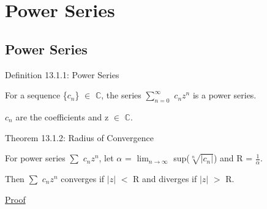 \newpage

\section[Day 13: Power Series]
{Power Series}

\subsection{ Power Series }

{ \color{blue} Definition 13.1.1: Power Series }

    \begin{adjustbox}{minipage=14cm, right, vspace=0.1cm 0cm}
        For a sequence \{$c_n$\} $\in$ $\mathbb{C}$, the series
        $\sum_{n=0}^{\infty}$ $c_n z^n$
        is a power series.

        $c_n$ are the coefficients and z $\in$ $\mathbb{C}$.
    \end{adjustbox}

    \vspace{0.5cm}

{ \color{red} Theorem 13.1.2: Radius of Convergence }

    \begin{adjustbox}{minipage=14cm, right, vspace=0.1cm 0cm}
        For power series $\sum$ $c_n z^n$, let
        $\alpha$ = $\lim_{n \rightarrow \infty}$ sup($\sqrt[n]{|c_n|}$)
        and R = $\frac{1}{\alpha}$.

        Then $\sum$ $c_n z^n$ converges if $|z|$ $<$ R and
        diverges if $|z|$ $>$ R.
    \end{adjustbox}

{ \color{magenta} \underline{Proof} }






